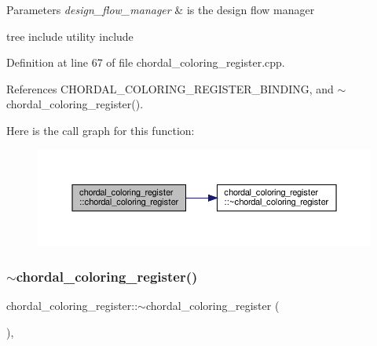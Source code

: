 \begin{DoxyParams}{Parameters}
{\em design\+\_\+flow\+\_\+manager} & is the design flow manager\\
\hline
\end{DoxyParams}
tree include utility include 

Definition at line 67 of file chordal\+\_\+coloring\+\_\+register.\+cpp.



References C\+H\+O\+R\+D\+A\+L\+\_\+\+C\+O\+L\+O\+R\+I\+N\+G\+\_\+\+R\+E\+G\+I\+S\+T\+E\+R\+\_\+\+B\+I\+N\+D\+I\+NG, and $\sim$chordal\+\_\+coloring\+\_\+register().

Here is the call graph for this function\+:
\nopagebreak
\begin{figure}[H]
\begin{center}
\leavevmode
\includegraphics[width=350pt]{d9/db4/classchordal__coloring__register_a39b63e92e57d05feaab4dd0363aa2e2f_cgraph}
\end{center}
\end{figure}
\mbox{\label{classchordal__coloring__register_a4c3218f3284d36d62e021f3f57c1e53f}} 
\subsubsection{\texorpdfstring{$\sim$chordal\+\_\+coloring\+\_\+register()}{~chordal\_coloring\_register()}}
{\footnotesize\ttfamily chordal\+\_\+coloring\+\_\+register\+::$\sim$chordal\+\_\+coloring\+\_\+register (\begin{DoxyParamCaption}{ }\end{DoxyParamCaption})\hspace{0.3cm}{\ttfamily [override]}, {\ttfamily [default]}}



